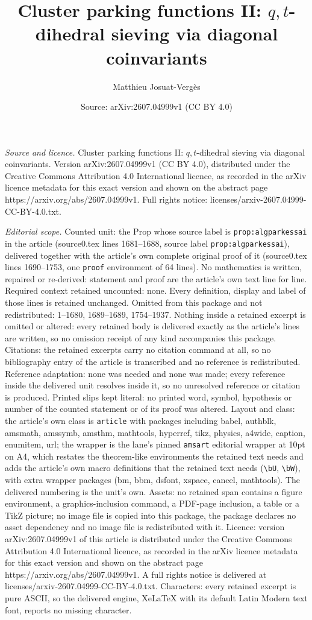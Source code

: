 \documentclass[10pt,a4paper]{amsart}
\title[Cluster parking functions II: $q,t$-dihedral sieving via dia]{Cluster parking functions II: $q,t$-dihedral sieving via diagonal coinvariants}
\author{Matthieu Josuat-Verg\`es}
\date{Source: arXiv:2607.04999v1 (CC BY 4.0)}
\begin{document}
\maketitle

\noindent\emph{Source and licence.} Cluster parking functions II: $q,t$-dihedral sieving via diagonal coinvariants. Version arXiv:2607.04999v1 (CC BY 4.0), distributed under the Creative Commons Attribution 4.0 International licence, as recorded in the arXiv licence metadata for this exact version and shown on the abstract page https://arxiv.org/abs/2607.04999v1. Full rights notice: licenses/arxiv-2607.04999-CC-BY-4.0.txt.\par\smallskip

\noindent\textit{Editorial scope.} Counted unit: the Prop whose source label is \texttt{prop:algparkessai} in the article (source0.tex lines 1681--1688, source label \texttt{prop:algparkessai}), delivered together with the article's own complete original proof of it (source0.tex lines 1690--1753, one \texttt{proof} environment of 64 lines). No mathematics is written, repaired or re-derived: statement and proof are the article's own text line for line. Required context retained uncounted: none. Every definition, display and label of those lines is retained unchanged. Omitted from this package and not redistributed: 1--1680, 1689--1689, 1754--1937. Nothing inside a retained excerpt is omitted or altered: every retained body is delivered exactly as the article's lines are written, so no omission receipt of any kind accompanies this package. Citations: the retained excerpts carry no citation command at all, so no bibliography entry of the article is transcribed and no reference is redistributed. Reference adaptation: none was needed and none was made; every reference inside the delivered unit resolves inside it, so no unresolved reference or citation is produced. Printed slips kept literal: no printed word, symbol, hypothesis or number of the counted statement or of its proof was altered. Layout and class: the article's own class is \texttt{article} with packages including babel, authblk, amsmath, amssymb, amsthm, mathtools, hyperref, tikz, physics, a4wide, caption, enumitem, url; the wrapper is the lane's pinned \texttt{amsart} editorial wrapper at 10pt on A4, which restates the theorem-like environments the retained text needs and adds the article's own macro definitions that the retained text needs (\texttt{\textbackslash bU}, \texttt{\textbackslash bW}), with extra wrapper packages (bm, bbm, dsfont, xspace, cancel, mathtools). The delivered numbering is the unit's own. Assets: no retained span contains a figure environment, a graphics-inclusion command, a PDF-page inclusion, a table or a TikZ picture; no image file is copied into this package, the package declares no asset dependency and no image file is redistributed with it. Licence: version arXiv:2607.04999v1 of this article is distributed under the Creative Commons Attribution 4.0 International licence, as recorded in the arXiv licence metadata for this exact version and shown on the abstract page https://arxiv.org/abs/2607.04999v1. A full rights notice is delivered at licenses/arxiv-2607.04999-CC-BY-4.0.txt. Characters: every retained excerpt is pure ASCII, so the delivered engine, XeLaTeX with its default Latin Modern text font, reports no missing character.
\end{document}
